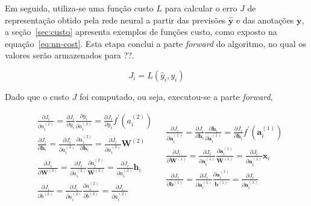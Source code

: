 Em seguida, utiliza-se uma função custo $L$ para calcular o erro $J$ de representação obtido pela rede neural a partir
das previsões $\mathbf{\hat{y}}$ e das anotações $\mathbf{y}$, a seção~\ref{sec:custo} apresenta exemplos de funções
custo, como exposto na equação~\ref{eq:nn-cost}.
Esta etapa conclui a parte \textit{forward} do algoritmo, no qual os valores serão armazenados para ??.

\begin{equation} \label{eq:nn-cost}
    J_i = L(\hat{y}_i, y_i)
\end{equation}

Dado que o custo $J$ foi computado, ou seja, executou-se a parte \textit{forward},

\begin{subequations} \label{nn-backprop}
\begin{align}
    &\frac{\partial{J_i}}{\partial{a_i^{(2)}}}
        = \frac{\partial{J_i}}{\partial{y_i}} \frac{\partial{y_i}}{\partial{a_i^{(2)}}}
        = \frac{\partial{J_i}}{\partial{y_i}} f^{\prime}(a_i^{(2)})\\
    &\frac{\partial{J_i}}{\partial{\mathbf{h}_i}}
        = \frac{\partial{J_i}}{\partial{a_i^{(2)}}} \frac{\partial{a_i^{(2)}}}{\partial{\mathbf{h}_i}}
        = \frac{\partial{J_i}}{\partial{a_i^{(2)}}} \mathbf{W}^{(2)}\\
    &\frac{\partial{J_i}}{\partial{\mathbf{W}^{(2)}}}
        = \frac{\partial{J_i}}{\partial{a_i^{(2)}}} \frac{\partial{a_i^{(2)}}}{\mathbf{W}^{(2)}}
        = \frac{\partial{J_i}}{\partial{a_i^{(2)}}} \mathbf{h}_i\\
    &\frac{\partial{J_i}}{\partial{b^{(2)}}}
        = \frac{\partial{J_i}}{\partial{a_i^{(2)}}} \frac{\partial{a_i^{(2)}}}{\partial{b^{(2)}}}
        = \frac{\partial{J_i}}{\partial{a_i^{(2)}}}
\end{align}

\begin{align}
    &\frac{\partial{J_i}}{\partial{\mathbf{a}_i^{(1)}}}
        = \frac{\partial{J_i}}{\partial{\mathbf{h}_i}} \frac{\partial{\mathbf{h}_i}}{\partial{\mathbf{a}_i^{(1)}}}
        = \frac{\partial{J_i}}{\partial{\mathbf{h}_i}} f^{\prime}(\mathbf{a}_i^{(1)})\\
    &\frac{\partial{J_i}}{\partial{\mathbf{W}^{(1)}}}
        = \frac{\partial{J_i}}{\partial{\mathbf{a}_i^{(1)}}} \frac{\partial{\mathbf{a}_i^{(1)}}}{\mathbf{W}^{(1)}}
        = \frac{\partial{J_i}}{\partial{\mathbf{a}_i^{(1)}}} \mathbf{x}_i\\
    &\frac{\partial{J_i}}{\partial{\mathbf{b}^{(1)}}}
        = \frac{\partial{J_i}}{\partial{\mathbf{a}_i^{(1)}}} \frac{\partial{\mathbf{a}_i^{(1)}}}{\mathbf{b}^{(1)}}
        = \frac{\partial{J_i}}{\partial{\mathbf{a}_i^{(1)}}}
\end{align}
\end{subequations}

